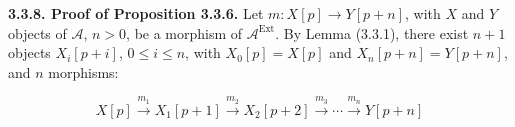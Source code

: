 \medskip\noindent\textbf{3.3.8. Proof of Proposition 3.3.6.}\quad
Let $m\colon X[p]\longrightarrow Y[p+n]$, with $X$ and $Y$ objects of
$\mathcal A$, $n>0$, be a morphism of $\mathcal A^{\operatorname{Ext}}$.
By Lemma (3.3.1), there exist $n+1$ objects
$X_i[p+i]$, $0\leq i\leq n$, with $X_0[p]=X[p]$ and
$X_n[p+n]=Y[p+n]$, and $n$ morphisms:

\[
X[p]\xrightarrow{m_1}X_1[p+1]\xrightarrow{m_2}X_2[p+2]
\xrightarrow{m_3}\cdots\xrightarrow{m_n}Y[p+n]
\]
\endgroup
